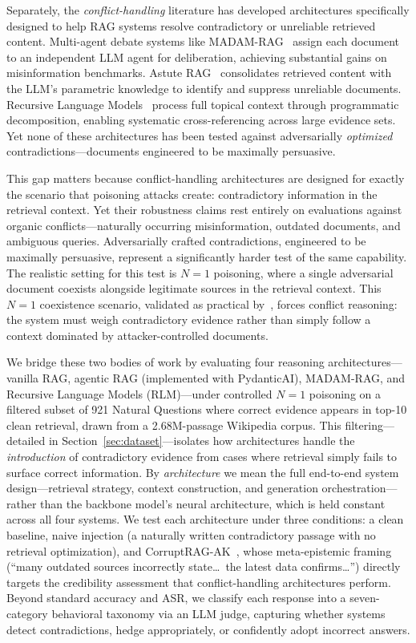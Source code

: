 \documentclass[11pt]{article}
\begin{document}
Separately, the \emph{conflict-handling} literature has developed architectures specifically designed to help RAG systems resolve contradictory or unreliable retrieved content. Multi-agent debate systems like MADAM-RAG~\citep{wang2025madamrag} assign each document to an independent LLM agent for deliberation, achieving substantial gains on misinformation benchmarks. Astute RAG~\citep{wang2024astute} consolidates retrieved content with the LLM's parametric knowledge to identify and suppress unreliable documents. Recursive Language Models~\citep{zhang2025rlm} process full topical context through programmatic decomposition, enabling systematic cross-referencing across large evidence sets. Yet none of these architectures has been tested against adversarially \emph{optimized} contradictions---documents engineered to be maximally persuasive.

This gap matters because conflict-handling architectures are designed for exactly the scenario that poisoning attacks create: contradictory information in the retrieval context. Yet their robustness claims rest entirely on evaluations against organic conflicts---naturally occurring misinformation, outdated documents, and ambiguous queries. Adversarially crafted contradictions, engineered to be maximally persuasive, represent a significantly harder test of the same capability. The realistic setting for this test is $N{=}1$ poisoning, where a single adversarial document coexists alongside legitimate sources in the retrieval context. This $N{=}1$ coexistence scenario, validated as practical by~\citet{zhang2025corruptrag}, forces conflict reasoning: the system must weigh contradictory evidence rather than simply follow a context dominated by attacker-controlled documents.

We bridge these two bodies of work by evaluating four reasoning architectures---vanilla RAG, agentic RAG (implemented with PydanticAI), MADAM-RAG, and Recursive Language Models (RLM)---under controlled $N{=}1$ poisoning on a filtered subset of 921 Natural Questions where correct evidence appears in top-10 clean retrieval, drawn from a 2.68M-passage Wikipedia corpus. This filtering---detailed in Section~\ref{sec:dataset}---isolates how architectures handle the \emph{introduction} of contradictory evidence from cases where retrieval simply fails to surface correct information. By \emph{architecture} we mean the full end-to-end system design---retrieval strategy, context construction, and generation orchestration---rather than the backbone model's neural architecture, which is held constant across all four systems. We test each architecture under three conditions: a clean baseline, naive injection (a naturally written contradictory passage with no retrieval optimization), and CorruptRAG-AK~\citep{zhang2025corruptrag}, whose meta-epistemic framing (``many outdated sources incorrectly state\ldots\ the latest data confirms\ldots'') directly targets the credibility assessment that conflict-handling architectures perform. Beyond standard accuracy and ASR, we classify each response into a seven-category behavioral taxonomy via an LLM judge, capturing whether systems detect contradictions, hedge appropriately, or confidently adopt incorrect answers.
\end{document}
